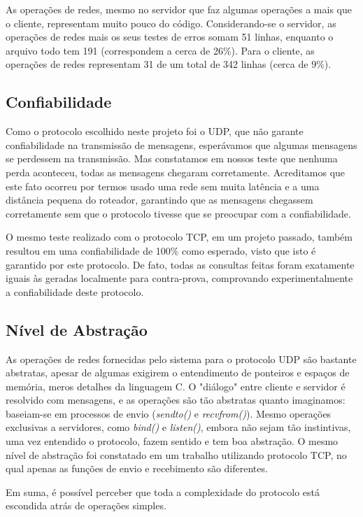 \documentclass[12pt,a4paper]{article}
\begin{document}
As operações de redes, mesmo no servidor que faz algumas operações a mais que o cliente, representam muito pouco do código. Considerando-se o servidor, as operações de redes mais os seus testes de erros somam 51 linhas, enquanto o arquivo todo tem 191 (correspondem a cerca de 26\%). Para o cliente, as operações de redes representam 31 de um total de 342 linhas (cerca de 9\%). 

\subsection{Confiabilidade}

Como o protocolo escolhido neste projeto foi o UDP, que não garante confiabilidade na transmissão de mensagens, esperávamos que algumas mensagens se perdessem na transmissão. Mas constatamos em nossos teste que nenhuma perda aconteceu, todas as mensagens chegaram corretamente. Acreditamos que este fato ocorreu por termos usado uma rede sem muita latência e a uma distância pequena do roteador, garantindo que as mensagens chegassem corretamente sem que o protocolo tivesse que se preocupar com a confiabilidade.

O mesmo teste realizado com o protocolo TCP, em um projeto passado, também resultou em uma confiabilidade de 100\% como esperado, visto que isto é garantido por este protocolo. De fato, todas as consultas feitas foram exatamente iguais às geradas localmente para contra-prova, comprovando experimentalmente a confiabilidade deste protocolo.

\subsection{Nível de Abstração}

As operações de redes fornecidas pelo sistema para o protocolo UDP são bastante abstratas, apesar de algumas exigirem o entendimento de ponteiros e espaços de memória, meros detalhes da linguagem C. O "diálogo" entre cliente e servidor é resolvido com mensagens, e as operações são tão abstratas quanto imaginamos: baseiam-se em processos de envio ({\it sendto()} e {\it recvfrom()}). Mesmo operações exclusivas a servidores, como {\it bind()} e {\it listen()}, embora não sejam tão instintivas, uma vez entendido o protocolo, fazem sentido e tem boa abstração. O mesmo nível de abstração foi constatado em um trabalho utilizando protocolo TCP, no qual apenas as funções de envio e recebimento são diferentes.

Em suma, é possível perceber que toda a complexidade do protocolo está escondida atrás de operações simples.
\end{document}
